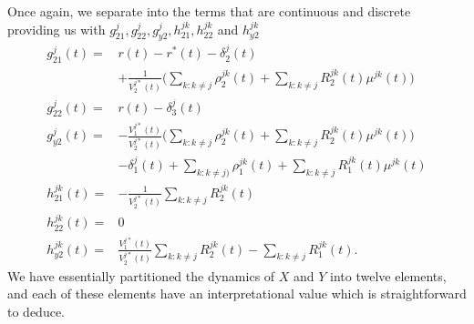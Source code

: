 \documentclass[12pt]{article}
\theoremstyle{my_thm}
\begin{document}
Once again, we separate into the terms that are continuous and discrete providing us with
$g_{21}^j,g_{22}^j,g_{y2}^j,h_{21}^{jk},h_{22}^{jk}$ and $h_{y2}^{jk}$
\begin{align*}
g^j_{21}(t)=&
r(t)-r^*(t)-\delta_2^{j}(t)
\\
& + \frac{1}{V_2^{j*}(t)} \bigg( 
\sum_{k:k\neq j} \rho_2^{jk}(t)
+\sum_{k:k \neq j}  R^{jk}_2(t) \mu^{jk}(t) 
\bigg)
\\
g^j_{22}(t)=& r(t) -\delta_3^{j}(t)
\\
g^j_{y2}(t)=& - \frac{V_1^{j*}(t)}{V_2^{j*}(t)}\bigg(
\sum_{k:k\neq j} \rho^{jk}_2(t) 
 +\sum_{k:k\neq j} R^{jk}_2(t) \mu^{jk}(t) 
\bigg)
\\
&-\delta_1^{j}(t)
+
\sum_{k:k\neq j)} \rho^{jk}_1(t) 
+\sum_{k:k \neq j}  R_1^{jk}(t) \mu^{jk}(t) 
\\
h^{jk}_{21}(t)=& 
- \frac{1}{V_2^{j*}(t)} \sum_{k:k \neq j}  R^{jk}_2(t)
\\
h^{jk}_{22}(t)=& 0
\\
h^{jk}_{y2}(t)=& \frac{V_1^{j*}(t)}{V_2^{j*}(t)}
\sum_{k:k\neq j} R^{jk}_2(t) 
-
\sum_{k:k \neq j}  R_1^{jk}(t).
\end{align*}
We have essentially partitioned the dynamics of $X$ and $Y$ into twelve elements, and each of these elements have an interpretational value which is straightforward to deduce.



\newpage


\end{document}

